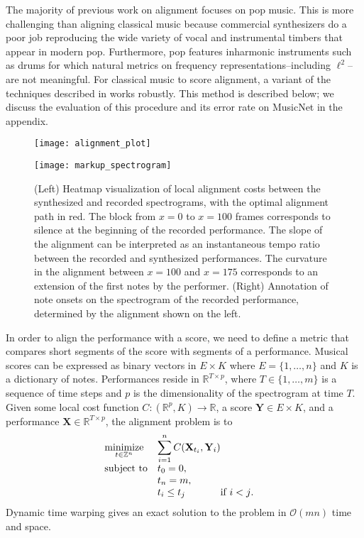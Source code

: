 \documentclass{article} \usepackage{iclr2017_conference,times}
\begin{document}
The majority of previous work on alignment focuses on pop music. This is more challenging than aligning classical music because commercial synthesizers do a poor job reproducing the wide variety of vocal and instrumental timbers that appear in modern pop. Furthermore, pop features inharmonic instruments such as drums for which natural metrics on frequency representations--including $\ell^2$--are not meaningful. For classical music to score alignment, a variant of the techniques described in \cite{turetsky} works robustly. This method is described below; we discuss the evaluation of this procedure and its error rate on MusicNet in the appendix.

\begin{figure}[h]
  \label{alignment}
  \centering
  
  \begin{minipage}{.5\textwidth}
  \texttt{[image: alignment\_plot]}
\end{minipage}\begin{minipage}{.5\textwidth}
  \texttt{[image: markup\_spectrogram]}
\end{minipage}

  \caption{(Left) Heatmap visualization of local alignment costs between the synthesized and recorded spectrograms, with the optimal alignment path in red. The block from $x=0$ to $x=100$ frames corresponds to silence at the beginning of the recorded performance. The slope of the alignment can be interpreted as an instantaneous tempo ratio between the recorded and synthesized performances. The curvature in the alignment between $x=100$ and $x=175$ corresponds to an extension of the first notes by the performer. (Right) Annotation of note onsets on the spectrogram of the recorded performance, determined by the alignment shown on the left.}
\end{figure}

In order to align the performance with a score, we need to define a metric that compares short segments of the score with segments of a performance. Musical scores can be expressed as binary vectors in $E \times K$ where $E = \{1,\dots,n\}$ and $K$ is a dictionary of notes. Performances reside in $\mathbb{R}^{T \times p}$, where $T \in \{1,\dots,m\}$ is a sequence of time steps and $p$ is the dimensionality of the spectrogram at time $T$. Given some local cost function $C : (\mathbb{R}^{p},K) \to \mathbb{R}$, a score $\mathbf{Y} \in E\times K$, and a performance $\mathbf{X} \in \mathbb{R}^{T\times p}$, the alignment problem is to
\begin{equation}\label{intprog}
\begin{array}{ll@{}ll}
\underset{t \in \mathbb{Z}^n}{\text{minimize}} & \displaystyle\sum_{i=1}^n C(\mathbf{X}_{t_i},\mathbf{Y}_i)&\\
\text{subject to}& t_0 = 0, & \\
                         & t_n = m, & \\
                         & t_i \leq t_j & \text{if $i < j$}. & 
\end{array}
\end{equation}
Dynamic time warping gives an exact solution to the problem in $\mathcal{O}(mn)$ time and space.
\end{document}
